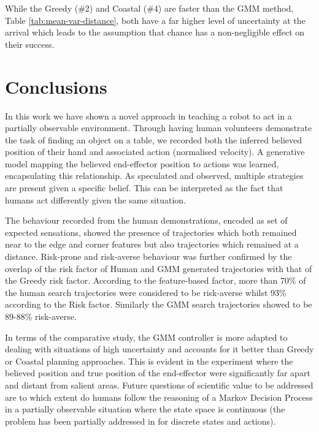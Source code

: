 While  the Greedy (\#2) and Coastal (\#4) are faster than the GMM method, Table \ref{tab:mean-var-distance}, both have a far higher level 
of uncertainty at the arrival which leads to the assumption that chance has a non-negligible effect on their success. 




\FloatBarrier
\section{Conclusions}

In this work we have shown a novel approach in teaching a robot to act in a partially observable environment. 
Through having human volunteers demonstrate the task of finding an object on a table, we recorded both the 
inferred believed position of their hand and associated action (normalised velocity). A generative model
mapping the believed end-effector position to actions was learned, encapsulating this relationship. 
As speculated and observed, multiple strategies are present given a specific belief. This can be interpreted as the fact that 
humans act differently given the same situation. 

The behaviour recorded from the human demonstrations, encoded as set of expected sensations, showed
the presence of trajectories which both remained near to the edge and corner features but also 
trajectories which remained at a distance. Risk-prone and risk-averse behaviour was further 
confirmed by the overlap of the risk factor of Human and GMM generated trajectories with that of the Greedy
risk factor. According to the feature-based factor, more than 70\% of the human search trajectories were considered
to be risk-averse whilst 93\% according to the Risk factor. Similarly the GMM search trajectories showed to be
89-88\% risk-averse.

In terms of the comparative study, the GMM controller is more adapted to dealing with situations of high uncertainty and 
accounts for it better than Greedy or Coastal planning approaches. This is evident in the experiment
where the believed position and true position of the end-effector were significantly far apart and distant from salient areas. 
Future questions of scientific value to be addressed are to which extent do humans follow the reasoning 
of a Markov Decision Process in a partially observable situation where the state space is continuous 
(the problem has been partially addressed in \cite{Bake_Saxe_Tene_2011} for discrete states and actions). 

